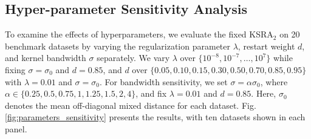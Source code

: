 \documentclass[ASNA,twocolumn]{USG} %
\begin{document}
\begin{table}[!ht]
	\centering
	\caption{Pairwise AUC comparisons between KSRA and baseline methods using Wilcoxon signed-rank tests with Holm correction.}\label{tab:wilcoxon_holm}
\end{table}

\subsection{Hyper-parameter Sensitivity Analysis}

To examine the effects of hyperparameters, we evaluate the fixed KSRA$_2$ on 20 benchmark datasets by varying the regularization parameter $\lambda$, restart weight $d$, and kernel bandwidth $\sigma$ separately. We vary $\lambda$ over $\{10^{-8},10^{-7},\ldots,10^7\}$ while fixing $\sigma=\sigma_0$ and $d=0.85$, and $d$ over $\{0.05,0.10,0.15,0.30,0.50,0.70,0.85,0.95\}$ with
$\lambda=0.01$ and $\sigma=\sigma_0$. For bandwidth sensitivity, we set $\sigma=\alpha\sigma_0$, where
$\alpha\in\{0.25,0.5,0.75,1,1.25,1.5,2,4\}$, and fix
$\lambda=0.01$ and $d=0.85$. Here, $\sigma_0$ denotes the
mean off-diagonal mixed distance for each dataset. Fig.\ref{fig:parameters_sensitivity} presents the results, with ten datasets shown in each panel.
\end{document}
